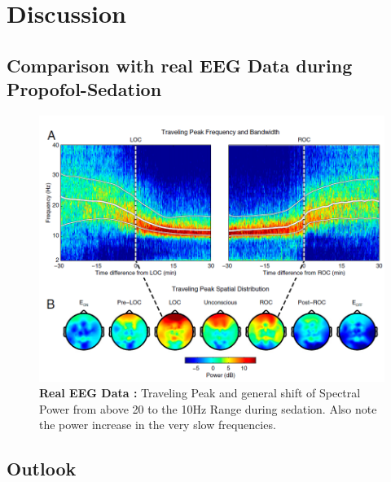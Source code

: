 \chapter{Discussion}

\section{Comparison with real EEG Data during Propofol-Sedation}

\begin{figure}[H]
\includegraphics[width=15cm]{Figures/purdon2.png}
\caption{\textbf{Real EEG Data \cite{purdon_electroencephalogram_2013}:} Traveling Peak and general shift of Spectral Power from above 20 to the 10Hz Range during sedation. Also note the power increase in the very slow frequencies.}
\end{figure}

\quad{}

\section{Outlook}

\quad{}